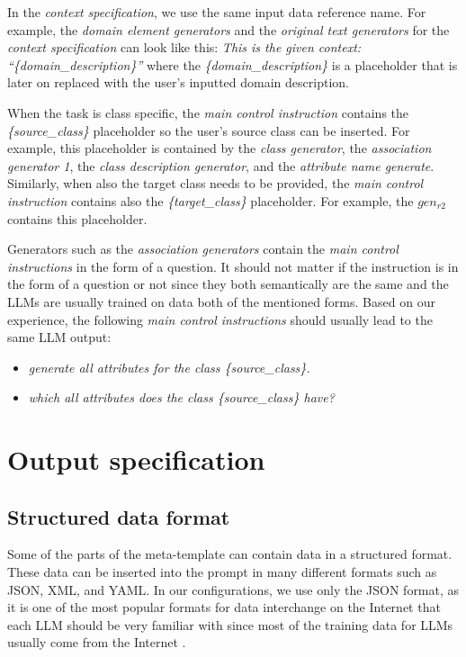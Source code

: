 In the \emph{context specification}, we use the same input data reference name. For example, the \emph{domain element generators} and the \emph{original text generators} for the \emph{context specification} can look like this: \textit{This is the given context: ``\{domain\_description\}''} where the \textit{\{domain\_description\}} is a placeholder that is later on replaced with the user's inputted domain description.

When the task is class specific, the \emph{main control instruction} contains the \textit{\{source\_class\}} placeholder so the user's source class can be inserted. For example, this placeholder is contained by the \textit{class generator}, the \textit{association generator 1}, the \textit{class description generator}, and the \textit{attribute name generate}. Similarly, when also the target class needs to be provided, the \emph{main control instruction} contains also the \textit{\{target\_class\}} placeholder. For example, the $gen_{r2}$ contains this placeholder.

Generators such as the \emph{association generators} contain the \emph{main control instructions} in the form of a question. It should not matter if the instruction is in the form of a question or not since they both semantically are the same and the LLMs are usually trained on data both of the mentioned forms. Based on our experience, the following \emph{main control instructions} should usually lead to the same LLM output:

\begin{itemize}
\item \textit{generate all attributes for the class \{source\_class\}.}
\item \textit{which all attributes does the class \{source\_class\} have?}
\end{itemize}


\section{Output specification}


\subsection{Structured data format}

Some of the parts of the meta-template can contain data in a structured format. These data can be inserted into the prompt in many different formats such as JSON, XML, and YAML. In our configurations, we use only the JSON format, as it is one of the most popular formats for data interchange on the Internet that each LLM should be very familiar with since most of the training data for LLMs usually come from the Internet \cite{Zhao2023}.


